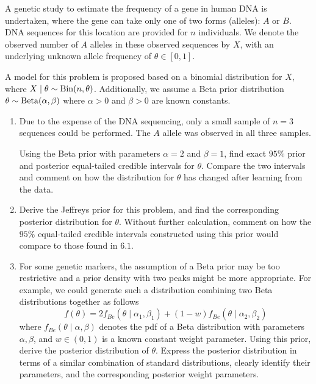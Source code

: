 \documentclass[10pt, a4paper]{article}
\begin{document}
\begin{problem}
    A genetic study to estimate the frequency of a gene in human DNA is undertaken,
    where the gene can take only one of two forms
    (alleles):
    $A$ or $B$.
    DNA sequences for this location are provided for $n$ individuals.
    We denote the observed number of $A$ alleles in these observed sequences by $X$,
    with an underlying unknown allele frequency of $\theta \in [0, 1]$.

    A model for this problem is proposed based on a binomial distribution for $X$,
    where $X \mid \theta \sim \operatorname{Bin}(n, \theta)$.
    Additionally,
    we assume a Beta prior distribution $\theta \sim \operatorname{Beta}(\alpha, \beta)$ where $\alpha > 0$ and $\beta > 0$ are known constants.

    \begin{enumerate}[label = 6.\arabic*]
        \item Due to the expense of the DNA sequencing,
        only a small sample of $n = 3$ sequences could be performed.
        The $A$ allele was observed in all three samples.
        
        Using the Beta prior with parameters $\alpha = 2$ and $\beta = 1$,
        find exact $95\%$ prior and posterior equal-tailed credible intervals for $\theta$.
        Compare the two intervals and comment on how the distribution for $\theta$ has changed after learning from the data.

        \item Derive the Jeffreys prior for this problem,
        and find the corresponding posterior distribution for $\theta$.
        Without further calculation,
        comment on how the $95\%$ equal-tailed credible intervals constructed using this prior would compare to those found in $6.1$.

        \item For some genetic markers,
        the assumption of a Beta prior may be too restrictive and a prior density with two peaks might be more appropriate.
        For example,
        we could generate such a distribution combining two Beta distributions together as follows
        \[
        f(\theta) = 2f_{Be}(\theta \mid \alpha_1, \beta_1) + (1 - w)f_{Be}(\theta \mid \alpha_2, \beta_2)
        \]
        where $f_{Be}(\theta \mid \alpha, \beta)$ denotes the pdf of a Beta distribution with parameters $\alpha, \beta$,
        and $w \in (0, 1)$ is a known constant weight parameter.
        Using this prior,
        derive the posterior distribution of $\theta$.
        Express the posterior distribution in terms of a similar combination of standard distributions,
        clearly identify their parameters,
        and the corresponding posterior weight parameters.
    \end{enumerate}


\end{problem}
\end{document}
